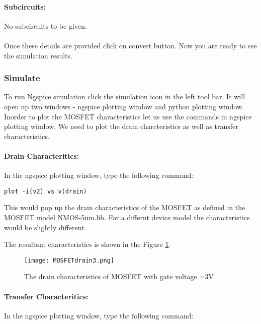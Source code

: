 \paragraph{Subcircuits:} No subcircuits to be given.

\paragraph{}
 Once these details are provided click on convert button. %
Now you are ready to see the simulation results.

\subsubsection{Simulate} To run Ngspice simulation click the simulation icon in the left tool bar. It will open up two windows - ngspice plotting window and python plotting window. Inorder to plot the MOSFET characteristics let us use the commands in ngspice plotting window. We need to plot the drain charcteristics as well as transfer characteristics.

\paragraph{Drain Characteritics:} In the ngspice plotting window, type the following command:

\texttt{plot -i(v2) vs v(drain)}

This would pop up the drain characteristics of the MOSFET as defined in the MOSFET model NMOS-5um.lib. For a differnt device model the characteristics would be slightly different.

The resultant characteristics is shown in the Figure \ref{MOSFETdrain3}.
\begin{figure}[h]
\centering
\texttt{[image: MOSFETdrain3.png]}
\caption{The drain characteristics of MOSFET with gate voltage =3V }
\label{MOSFETdrain3}
\end{figure}

\paragraph{Transfer Characteritics:} In the ngspice plotting window, type the following command:

